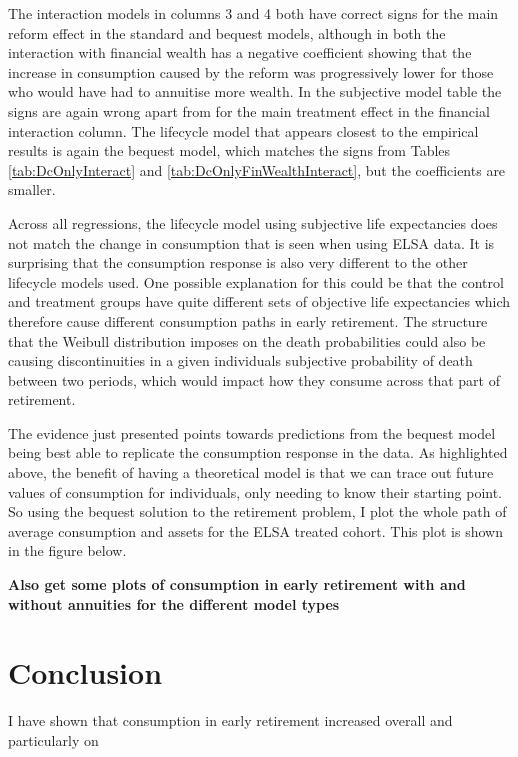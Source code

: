 \documentclass[12pt]{article}
\begin{document}
The interaction models in columns 3 and 4 both have correct signs for the main
reform effect in the standard and bequest models, although in both the
interaction with financial wealth has a negative coefficient showing that the
increase in consumption caused by the reform was progressively lower for those
who would have had to annuitise more wealth. In the subjective model table the
signs are again wrong apart from for the main treatment effect in the financial
interaction column. The lifecycle model that appears closest to the empirical
results is again the bequest model, which matches the signs from Tables
\ref{tab:DcOnlyInteract} and \ref{tab:DcOnlyFinWealthInteract}, but the
coefficients are smaller.

Across all regressions, the lifecycle model using subjective life expectancies
does not match the change in consumption that is seen when using ELSA data. It
is surprising that the consumption response is also very different to the other
lifecycle models used. One possible explanation for this could be that the
control and treatment groups have quite different sets of objective life
expectancies which therefore cause different consumption paths in early
retirement. The structure that the Weibull distribution imposes on the
death probabilities could also be causing discontinuities in a given
individuals subjective probability of death between two periods, which would
impact how they consume across that part of retirement.

The evidence just presented points towards predictions from the bequest model
being best able to replicate the consumption response in the data. As
highlighted above, the benefit of having a theoretical model is that we can
trace out future values of consumption for individuals, only needing to know
their starting point. So using the bequest solution to the retirement problem, I
plot the whole path of average consumption and assets for the ELSA treated
cohort. This plot is shown in the figure below.



\textbf{Also get some plots of consumption in early retirement with and without
    annuities for the different model types}


\section{Conclusion}

I have shown that consumption in early retirement increased overall and
particularly on
\end{document}
